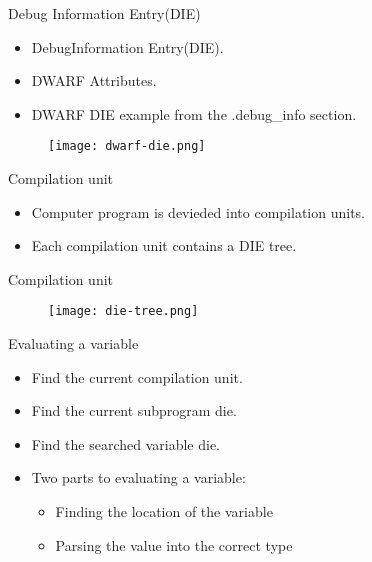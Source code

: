 
\begin{frame}{Debug Information Entry(DIE)}
	\begin{itemize}
	    \item DebugInformation Entry(DIE).
	    \item DWARF Attributes.
	    \item DWARF DIE example from the .debug\_info section.
	\end{itemize}
	\begin{figure}
		\texttt{[image: dwarf-die.png]}
	\end{figure}
\end{frame}


\begin{frame}{Compilation unit}
	\begin{itemize}
		\item Computer program is devieded into compilation units.
		\item Each compilation unit contains a DIE tree.
	\end{itemize}
\end{frame}


\begin{frame}{Compilation unit}
	\begin{figure}
		\texttt{[image: die-tree.png]}
	\end{figure}
\end{frame}


\begin{frame}{Evaluating a variable}
	\begin{itemize}
		\item Find the current compilation unit.
		\item Find the current subprogram die.
		\item Find the searched variable die. 
		\item Two parts to evaluating a variable:
			\begin{itemize}
				\item Finding the location of the variable
				\item Parsing the value into the correct type
			\end{itemize}
	\end{itemize}
\end{frame}

